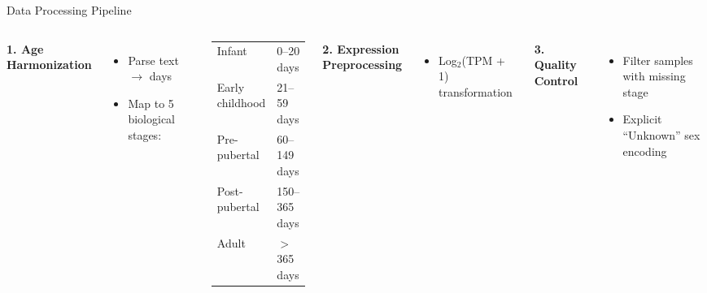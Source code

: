 \documentclass[aspectratio=169, 11pt, t]{beamer}
\newcommand{\cardiffHeading}[1]{\textcolor{CardiffBlack}{\fontsize{12}{15}\selectfont \textbf{#1}}}
\begin{document}
\begin{frame}{Data Processing Pipeline}
    \vspace{0.2cm}
    \begin{columns}[T, onlytextwidth]
            \hspace{0.22cm}\cardiffHeading{1. Age Harmonization}
            \vspace{0.3em}
            {\small
            \begin{itemize}
                \item Parse text $\rightarrow$ days
                \item Map to 5 biological stages:
            \end{itemize}
            \vspace{0.2em}
            \begin{center}
            \begin{tabular}{ll}
                \scriptsize Infant & \scriptsize 0--20 days \\
                \scriptsize Early childhood & \scriptsize 21--59 days \\
                \scriptsize Pre-pubertal & \scriptsize 60--149 days \\
                \scriptsize Post-pubertal & \scriptsize 150--365 days \\
                \scriptsize Adult & \scriptsize $>$365 days \\
            \end{tabular}
            \end{center}
            }
            
            \vspace{0.3em}
            \cardiffHeading{2. Expression Preprocessing}
            \vspace{0.3em}
            {\small
            \begin{itemize}
                \item Log$_2$(TPM + 1) transformation
            \end{itemize}
            }

            \cardiffHeading{3. Quality Control}
            \vspace{0.3em}
            {\small
            \begin{itemize}
                \item Filter samples with missing stage
                \item Explicit ``Unknown'' sex encoding
            \end{itemize}
            }
            

\end{columns}
\end{frame}
\end{document}
